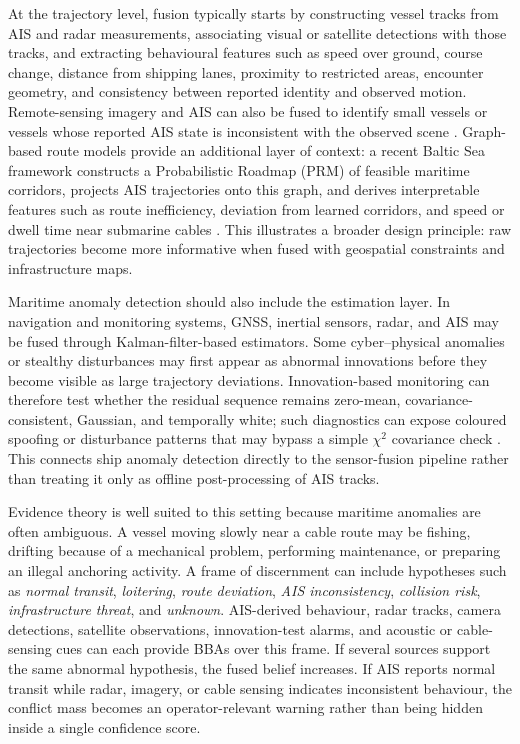 \documentclass{ieeeaccess}
\begin{document}
At the trajectory level, fusion typically starts by constructing vessel tracks from AIS and radar measurements, associating visual or satellite detections with those tracks, and extracting behavioural features such as speed over ground, course change, distance from shipping lanes, proximity to restricted areas, encounter geometry, and consistency between reported identity and observed motion. Remote-sensing imagery and AIS can also be fused to identify small vessels or vessels whose reported AIS state is inconsistent with the observed scene \cite{chen_sviadf_2025}. Graph-based route models provide an additional layer of context: a recent Baltic Sea framework constructs a Probabilistic Roadmap (PRM) of feasible maritime corridors, projects AIS trajectories onto this graph, and derives interpretable features such as route inefficiency, deviation from learned corridors, and speed or dwell time near submarine cables \cite{oliva_tomei_prm_access_2026}. This illustrates a broader design principle: raw trajectories become more informative when fused with geospatial constraints and infrastructure maps.

Maritime anomaly detection should also include the estimation layer. In navigation and monitoring systems, GNSS, inertial sensors, radar, and AIS may be fused through Kalman-filter-based estimators. Some cyber--physical anomalies or stealthy disturbances may first appear as abnormal innovations before they become visible as large trajectory deviations. Innovation-based monitoring can therefore test whether the residual sequence remains zero-mean, covariance-consistent, Gaussian, and temporally white; such diagnostics can expose coloured spoofing or disturbance patterns that may bypass a simple \(\chi^2\) covariance check \cite{oliva_innovation_2026}. This connects ship anomaly detection directly to the sensor-fusion pipeline rather than treating it only as offline post-processing of AIS tracks.

Evidence theory is well suited to this setting because maritime anomalies are often ambiguous. A vessel moving slowly near a cable route may be fishing, drifting because of a mechanical problem, performing maintenance, or preparing an illegal anchoring activity. A frame of discernment can include hypotheses such as \emph{normal transit}, \emph{loitering}, \emph{route deviation}, \emph{AIS inconsistency}, \emph{collision risk}, \emph{infrastructure threat}, and \emph{unknown}. AIS-derived behaviour, radar tracks, camera detections, satellite observations, innovation-test alarms, and acoustic or cable-sensing cues can each provide BBAs over this frame. If several sources support the same abnormal hypothesis, the fused belief increases. If AIS reports normal transit while radar, imagery, or cable sensing indicates inconsistent behaviour, the conflict mass becomes an operator-relevant warning rather than being hidden inside a single confidence score.
\end{document}

